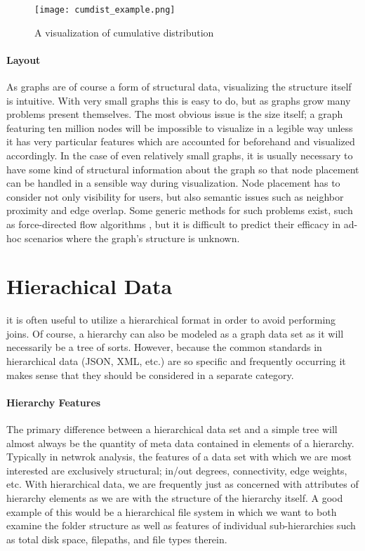 \begin{figure}
	\centering
	\texttt{[image: cumdist\_example.png]}
	\caption{A visualization of cumulative distribution \cite{KONECT}}
	\label{fig:cumdist}
\end{figure}

\paragraph{Layout}
As graphs are of course a form of structural data, visualizing the structure itself is intuitive. With very small graphs this is easy to do, but as graphs grow many problems present themselves. The most obvious issue is the size itself; a graph featuring ten million nodes will be impossible to visualize in a legible way unless it has very particular features which are accounted for beforehand and visualized accordingly. In the case of even relatively small graphs, it is usually necessary to have some kind of structural information about the graph so that node placement can be handled in a sensible way during visualization. Node placement has to consider not only visibility for users, but also semantic issues such as neighbor proximity and edge overlap. Some generic methods for such problems exist, such as force-directed flow algorithms \cite{Didimo2011}, but it is difficult to predict their efficacy in ad-hoc scenarios where the graph's structure is unknown.
 

\section{Hierachical Data}
\label{sec:hierarchical}
 it is often useful to utilize a hierarchical format in order to avoid performing joins. Of course, a hierarchy can also be modeled as a graph data set as it will necessarily be a tree of sorts. However, because the common standards in hierarchical data (JSON, XML, etc.) are so specific and frequently occurring it makes sense that they should be considered in a separate category.

\paragraph{Hierarchy Features}
The primary difference between a hierarchical data set and a simple tree will almost always be the quantity of meta data contained in elements of a hierarchy. Typically in netwrok analysis, the features of a data set with which we are most interested are exclusively structural; in/out degrees, connectivity, edge weights, etc. With hierarchical data, we are frequently just as concerned with attributes of hierarchy elements as we are with the structure of the hierarchy itself. A good example of this would be a hierarchical file system in which we want to both examine the folder structure as well as features of individual sub-hierarchies such as total disk space, filepaths, and file types therein. 

